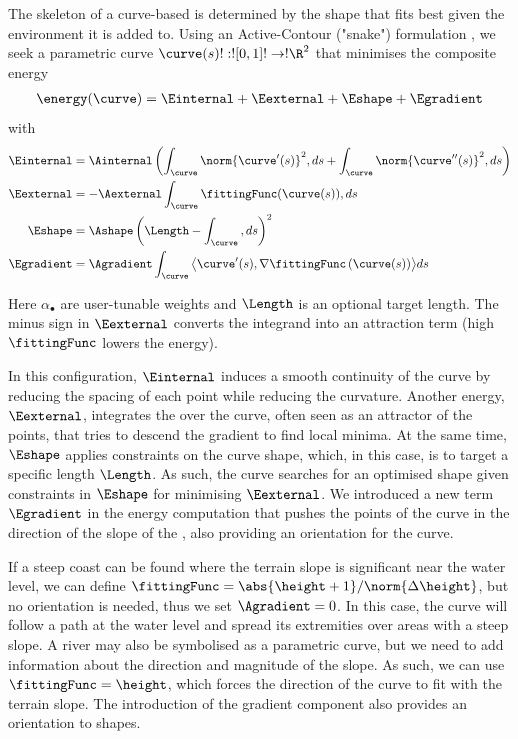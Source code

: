 The skeleton of a curve-based  is determined by the shape that fits best given the environment it is added to.
Using an Active-Contour ("snake") formulation \cite{Kass1988}, we seek a parametric curve $\curve(s)!:![0,1]!\to!\R^{2}$ that minimises the composite energy
\begin{align}
\energy(\curve) = \Einternal + \Eexternal + \Eshape + \Egradient
\end{align}
with
\begin{align}
    \label{eq:env-obj-snake-energy-equation-internal}
    \Einternal &= \Ainternal \left( \int_{\curve}{ \norm{\curve'(s)}^2 , ds} + \int_{\curve}{ \norm{\curve''(s)}^2 , ds} \right) \\
    \label{eq:env-obj-snake-energy-equation-external}
    \Eexternal &= -\Aexternal \int_{\curve}{ \fittingFunc(\curve(s)) , ds } \\
    \label{eq:env-obj-snake-energy-equation-shape}
    \Eshape &= \Ashape \left( \Length - \int_{\curve}{ , ds } \right)^2 \\
    \label{eq:env-obj-snake-energy-equation-gradient}
    \Egradient &= \Agradient \int_{\curve}{\bigl\langle \curve'(s),\nabla\fittingFunc\left(\curve(s)\right)\bigr\rangle ds}
\end{align}

Here $\alpha_{\bullet}$ are user-tunable weights and $\Length$ is an optional target length. The minus sign in $\Eexternal$ converts the integrand into an attraction term (high $\fittingFunc$ lowers the energy).

In this configuration, $\Einternal$ induces a smooth continuity of the curve by reducing the spacing of each point while reducing the curvature. Another energy, $\Eexternal$, integrates the  over the curve, often seen as an attractor of the points, that tries to descend the gradient to find local minima. At the same time, $\Eshape$ applies constraints on the curve shape, which, in this case, is to target a specific length $\Length$. As such, the curve searches for an optimised shape given constraints in $\Eshape$ for minimising $\Eexternal$. We introduced a new term $\Egradient$ in the energy computation that pushes the points of the curve in the direction of the slope of the , also providing an orientation for the curve.

If a steep coast can be found where the terrain slope is significant near the water level, we can define $\fittingFunc = \abs{\height + 1} / \norm{\Delta \height}$, but no orientation is needed, thus we set $\Agradient = 0$. In this case, the curve will follow a path at the water level and spread its extremities over areas with a steep slope. A river may also be symbolised as a parametric curve, but we need to add information about the direction and magnitude of the slope. As such, we can use $\fittingFunc = \height$, which forces the direction of the curve to fit with the terrain slope. The introduction of the gradient component also provides an orientation to shapes.


